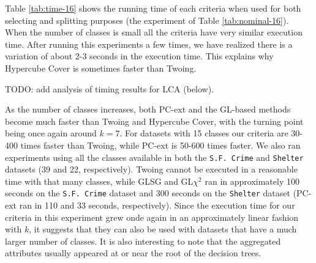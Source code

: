 Table \ref{tab:time-16} shows the running time of each criteria when used for both selecting and splitting purposes (the experiment of Table \ref{tab:nominal-16}).
When the number of classes is small all the criteria have very similar execution time. After running this experiments a few times, we have realized there is a variation of about 2-3 seconds in the execution time. This explains why Hypercube Cover is sometimes faster than Twoing.


TODO: add analysis of timing results for LCA (below).

As the number of classes increases, both PC-ext and the GL-based methods become much faster than Twoing and Hypercube Cover, with the turning point being once again around $k=7$. For datasets with 15 classes our criteria are 30-400 times faster than Twoing, while PC-ext is 50-600 times faster. We also ran experiments using all the classes available in both the {\tt S.F. Crime} and {\tt Shelter} datasets (39 and 22, respectively). Twoing cannot be executed in a reasonable time with that many classes, while GLSG and GL$\chi^2$ ran in approximately 100 seconds on the {\tt S.F. Crime} dataset and  300 seconds on the {\tt Shelter} dataset (PC-ext ran in 110 and 33 seconds, respectively). Since the execution time for our criteria in this experiment grew onde again in an approximately linear fashion with $k$, it suggests that they can also be used with datasets that have a much larger number of classes. It is also interesting to note that the aggregated attributes usually appeared at or near the root of the decision trees.

